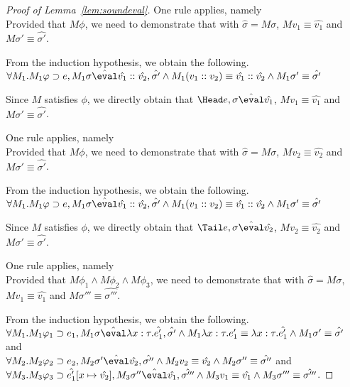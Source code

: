 \begin{proof}[Proof of Lemma~\ref{lem:soundeval}]
  {One rule applies, namely \\
  Provided that $M\phi$,
  we need to demonstrate that  with $\hat{\sigma}=M\sigma$,
  $M v_1\equiv \hat{v_1}$ and $M\sigma'\equiv\hat{\sigma'}$.

  From the induction hypothesis, we obtain the following.\\
  $\forall M_1 . M_1\phi \implies e, M_1\sigma\hat{\eval}\hat{v_1}::\hat{v_2},\hat{\sigma'}\land M_1 (v_1::v_2)\equiv \hat{v_1}::\hat{v_2}\land M_1\sigma'\equiv\hat{\sigma'}$

  Since $M$ satisfies $\phi$,
  we directly obtain that $\Head e,\sigma\hat{\eval}\hat{v_1}$,
  $M v_1\equiv \hat{v_1}$ and $M\sigma'\equiv\hat{\sigma'}$.}

  {One rule applies, namely \\
    Provided that $M\phi$,
    we need to demonstrate that  with $\hat{\sigma}=M\sigma$,
    $M v_2\equiv \hat{v_2}$ and $M\sigma'\equiv\hat{\sigma'}$.

    From the induction hypothesis, we obtain the following.\\
    $\forall M_1 . M_1\phi \implies e, M_1\sigma\hat{\eval}\hat{v_1}::\hat{v_2},\hat{\sigma'}\land M_1(v_1::v_2)\equiv \hat{v_1}::\hat{v_2}\land M_1\sigma'\equiv\hat{\sigma'}$

    Since $M$ satisfies $\phi$,
    we directly obtain that $\Tail e,\sigma\hat{\eval}\hat{v_2}$,
    $M v_2\equiv \hat{v_2}$ and $M\sigma'\equiv\hat{\sigma'}$.}

  {One rule applies, namely \\
  Provided that $M\phi_1 \land M\phi_2\land M\phi_3$,
  we need to demonstrate that
   with $\hat{\sigma}=M\sigma$,
   $M v_1 \equiv \hat{v_1}$ and $M\sigma'''\equiv\hat{\sigma'''}$.

  From the induction hypothesis, we obtain the following.\\
  $\forall M_1 . M_1\phi_1 \implies e_1,M_1\sigma\hat{\eval}\lambda x : \tau.\hat{e_1'},\hat{\sigma'}
  \land M_1\lambda x : \tau.e_1' \equiv \lambda x : \tau.\hat{e_1'} \land M_1\sigma'\equiv\hat{\sigma'}$
  and\\
  $\forall M_2 . M_2\phi_2 \implies e_2,M_2\sigma'\hat{\eval}\hat{v_2},\hat{\sigma''}
  \land M_2 v_2 \equiv \hat{v_2} \land M_2\sigma'' \equiv\hat{\sigma''}$
  and\\
  $\forall M_3 . M_3\phi_3 \implies \hat{e_1'}[x\mapsto \hat{v_2}],M_3\sigma''\hat{\eval}\hat{v_1},\hat{\sigma'''}
  \land M_3 v_1\equiv \hat{v_1} \land M_3 \sigma'''\equiv\hat{\sigma'''}$.

}
\end{proof}
